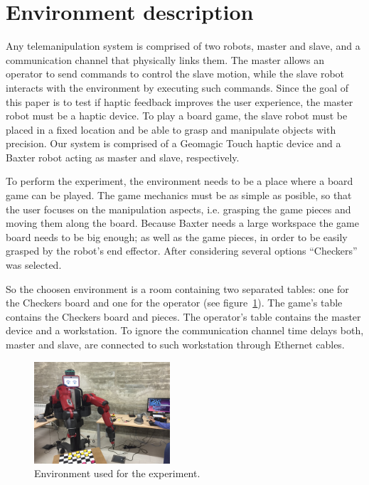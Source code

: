\documentclass[journal,twoside]{JoPhA}
\begin{document}
\section{Environment description}
\label{sec:environment}

  Any telemanipulation system is comprised of two robots, master and slave, and a communication channel that physically links them. The master allows an operator to send commands to control the slave motion, while the slave robot interacts with the environment by executing such commands. Since the goal of this paper is to test if haptic feedback improves the user experience, the master robot must be a haptic device. To play a board game, the slave robot must be placed in a fixed location and be able to grasp and manipulate objects with precision. Our system is comprised of a Geomagic Touch haptic device and a Baxter robot acting as master and slave, respectively.
    
  To perform the experiment, the environment needs to be a place where a board game can be played. The game mechanics must be as simple as posible, so that the user focuses on the manipulation aspects, i.e. grasping the game pieces and moving them along the board. Because Baxter needs a large workspace the game board needs to be big enough; as well as the game pieces, in order to be easily grasped by the robot's end effector. After considering several options ``Checkers'' was selected.
  
  So the choosen environment is a room containing two separated tables: one for the Checkers board and one for the operator (see figure~\ref{fig:environment:environment}). The game's table contains the Checkers board and pieces. The operator's table contains the master device and a workstation. To ignore the communication channel time delays both, master and slave, are connected to such workstation through Ethernet cables.
    
\begin{figure}[!ht]
  \centering
  \includegraphics[width=0.45\textwidth]{Images/Baxter&Haptic.jpg}
  
  \caption{Environment used for the experiment.}
  \label{fig:environment:environment}
\end{figure}
\end{document}
